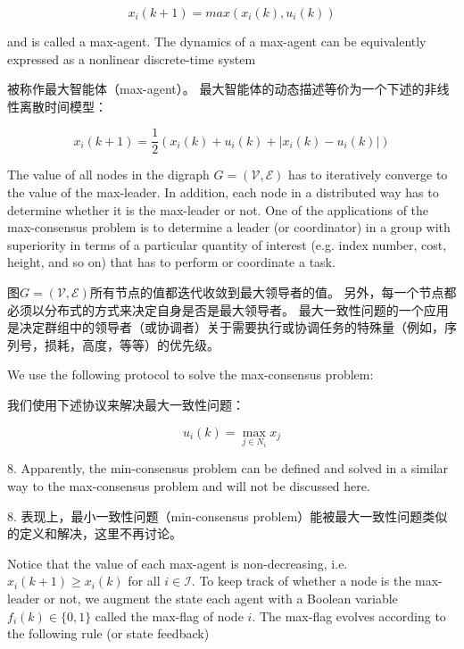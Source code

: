 \documentclass{article}
\begin{document}
\begin{equation}
    \tag{41}
    \label{41}
    x_i(k+1)=max(x_i(k),u_i(k))
\end{equation}

{\color[gray]{0.5}
\noindent and is called a max-agent. 
The dynamics of a max-agent can be equivalently expressed as a nonlinear discrete-time system
}

\noindent 被称作最大智能体（max-agent）。
最大智能体的动态描述等价为一个下述的非线性离散时间模型：

\begin{equation}
    \tag{42}
    \label{42}
    x_i(k+1) = \frac{1}{2}(x_i(k)+u_i(k)+|x_i(k)-u_i(k)|)
\end{equation}

{\color[gray]{0.5}
\noindent The value of all nodes in the digraph $G=(\mathcal{V},\mathcal{E})$ has to iteratively converge to the value of the max-leader. 
In addition, each node in a distributed way has to determine whether it is the max-leader or not. 
One of the applications of the max-consensus problem is to determine a leader (or coordinator) in a group with superiority in terms of a particular quantity of interest (e.g. index number, cost, height, and so on) that has to perform or coordinate a task.
}

\noindent 图$G=(\mathcal{V},\mathcal{E})$所有节点的值都迭代收敛到最大领导者的值。
另外，每一个节点都必须以分布式的方式来决定自身是否是最大领导者。
最大一致性问题的一个应用是决定群组中的领导者（或协调者）关于需要执行或协调任务的特殊量（例如，序列号，损耗，高度，等等）的优先级。

{\color[gray]{0.5}
We use the following protocol to solve the max-consensus problem:
}

我们使用下述协议来解决最大一致性问题：

\begin{equation}
    \tag{A4}
    \label{A4}
    u_i(k) = \max_{j\in N_i}x_j
\end{equation}

{\color[gray]{0.5}
 8. Apparently, the min-consensus problem can be deﬁned and solved in a similar way to the max-consensus problem and will not be discussed here.
}

 8. 表现上，最小一致性问题（min-consensus problem）能被最大一致性问题类似的定义和解决，这里不再讨论。

{\color[gray]{0.5}
Notice that the value of each max-agent is non-decreasing, i.e. $x_i(k+1)\ge x_i(k)$ for all $i\in\mathcal{I}$. 
To keep track of whether a node is the max-leader or not, we augment the state each agent with a Boolean variable $f_i(k)\in\{0,1\}$ called the max-ﬂag of node $i$. 
The max-ﬂag evolves according to the following rule (or state feedback)
}
\end{document}
